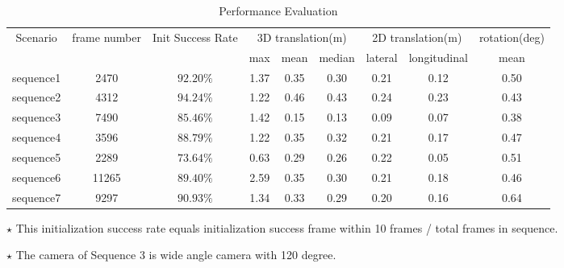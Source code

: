 \documentclass[letterpaper, 10 pt, conference]{ieeeconf}
\begin{document}
\begin{table*}
\caption{Performance Evaluation}
\centering
\begin{tabular}{c|c|c|ccc|cc|c}
\hline
\multicolumn{1}{c|}{\multirow{2}{*}{Scenario}} & \multicolumn{1}{c|}{\multirow{2}{*}{frame number}} & \multicolumn{1}{c|}{\multirow{2}{*}{Init Success Rate}} & \multicolumn{3}{c|}{3D translation(m)}    & \multicolumn{2}{c|}{2D translation(m)}      & \multicolumn{1}{c}{rotation(deg)} \\ \cline{4-9} 
\multicolumn{1}{c|}{} &\multicolumn{1}{c|}{} &\multicolumn{1}{c|}{} & max  & mean  & \multicolumn{1}{c|}{median} & lateral & \multicolumn{1}{c|}{longitudinal} & \multicolumn{1}{c}{mean}          \\

\hline
sequence1   & 2470 &  $92.20\%$ &1.37       & 0.35       & 0.30         & 0.21        & 0.12       & 0.50           \\
sequence2   & 4312 & $94.24\%$ &  1.22       & 0.46       & 0.43        & 0.24        & 0.23   & 0.43          \\
sequence3   & 7490  & $85.46\%$ & 1.42       & 0.15       & 0.13        & 0.09    & 0.07     & 0.38          \\
sequence4   & 3596 & $88.79\%$ & 1.22       & 0.35       & 0.32        & 0.21       & 0.17    & 0.47          \\
sequence5   & 2289 & $73.64\%$  & 0.63       & 0.29       & 0.26        & 0.22       & 0.05    & 0.51          \\
sequence6   & 11265 & $89.40\%$ & 2.59       & 0.35       & 0.30        & 0.21      & 0.18     & 0.46          \\
sequence7   & 9297 & $90.93\%$ & 1.34       & 0.33       & 0.29        & 0.20      & 0.16     & 0.64         \\
\hline
    \end{tabular}
    \begin{tablenotes} 
		\item $\star$ This initialization success rate equals initialization success frame within 10 frames / total frames in sequence. \\
		\item $\star$ The camera of Sequence 3 is wide angle camera with 120 degree. \\
     \end{tablenotes}
    
    \label{tab:accuracy}
\end{table*}
\end{document}
